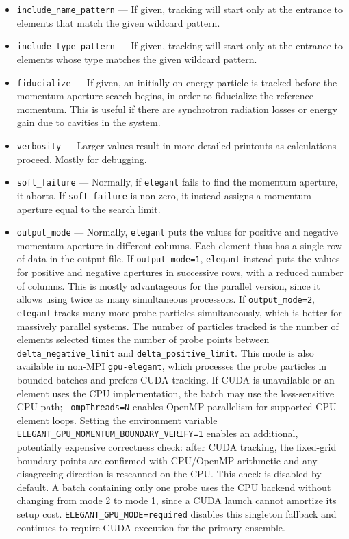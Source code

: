 \documentclass[11pt]{article}
\begin{document}
\begin{itemize}
\item \verb|include_name_pattern| --- If given, tracking will start
only at the entrance to elements that match the given wildcard
pattern.

\item \verb|include_type_pattern| --- If given, tracking will start
only at the entrance to elements whose type matches the given wildcard
pattern.

\item \verb|fiducialize| --- If given, an initially on-energy particle is tracked before
 the momentum aperture search begins, in order to fiducialize the reference momentum.
 This is useful if there are synchrotron radiation losses or energy gain due to cavities
 in the system.

\item \verb|verbosity| --- Larger values result in more detailed
printouts as calculations proceed.  Mostly for debugging.

\item \verb|soft_failure| --- Normally, if {\tt elegant} fails to find the momentum aperture,
it aborts.  If \verb|soft_failure| is non-zero, it instead assigns a momentum aperture equal
to the search limit.

\item \verb|output_mode| --- Normally, {\tt elegant} puts the values for positive and
negative momentum aperture in different columns.  Each element thus has a single row of
data in the output file.  If \verb|output_mode=1|, {\tt elegant} instead puts
the values for positive and negative apertures in successive rows, with a reduced number
of columns.  This is mostly advantageous for the parallel version, since it allows using
twice as many simultaneous processors.
If \verb|output_mode=2|, {\tt elegant} tracks many more probe particles simultaneously, which
is better for massively parallel systems. The number of particles tracked is the number of
elements selected times the number of probe points between  \verb|delta_negative_limit| and \verb|delta_positive_limit|.
This mode is also available in non-MPI \verb|gpu-elegant|, which processes the
probe particles in bounded batches and prefers CUDA tracking.  If CUDA is
unavailable or an element uses the CPU implementation, the batch may use the
loss-sensitive CPU path; \verb|-ompThreads=N| enables OpenMP parallelism for
supported CPU element loops.  Setting the environment variable
\verb|ELEGANT_GPU_MOMENTUM_BOUNDARY_VERIFY=1| enables an additional,
potentially expensive correctness check: after CUDA tracking, the fixed-grid
boundary points are confirmed with CPU/OpenMP arithmetic and any disagreeing
direction is rescanned on the CPU.  This check is disabled by default.  A
batch containing only one probe uses the CPU
backend without changing from mode 2 to mode 1, since a CUDA launch cannot
amortize its setup cost.  \verb|ELEGANT_GPU_MODE=required| disables this
singleton fallback and continues to require CUDA execution for the primary
ensemble.


\end{itemize}
\end{document}
